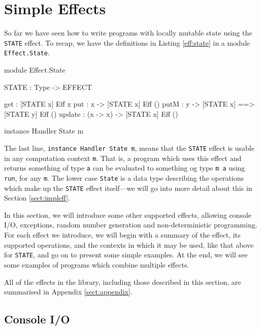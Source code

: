 \section{Simple Effects}

\label{sect:simpleff}

So far we have seen how to write programs with locally mutable state using the
\texttt{STATE} effect. To recap, we have the definitions in
Listing \ref{eff:state} in a module \texttt{Effect.State}.

\begin{code}[float=h,frame=single,caption={State Effect}, label=eff:state]
module Effect.State

STATE : Type -> EFFECT

get    :             { [STATE x] } Eff x
put    : x ->        { [STATE x] } Eff () 
putM   : y ->        { [STATE x] ==> [STATE y] } Eff () 
update : (x -> x) -> { [STATE x] } Eff () 

instance Handler State m
\end{code}

\noindent
The last line, \texttt{instance Handler State m}, means that the \texttt{STATE}
effect is usable in any computation context \texttt{m}. That is, a program
which uses this effect and returns something of type \texttt{a} can be
evaluated to something og type \texttt{m a} using \texttt{run}, for
any \texttt{m}.
%
The lower case \texttt{State} is a data type describing the operations which
make up the \texttt{STATE} effect itself---we will go into more detail about
this in Section \ref{sect:impleff}.

In this section, we will introduce some other supported effects, allowing
console I/O, exceptions, random number generation and non-deterministic
programming.
For each effect we introduce, we will begin with a summary of the effect,
its supported operations, and the contexts in which it may be used,
like that above for \texttt{STATE}, and go on to
present some simple examples. At the end, we will see some examples of programs
which combine multiple effects.

All of the effects in the library, including those described in this section,
are summarised in Appendix \ref{sect:appendix}.

\subsection{Console I/O}

